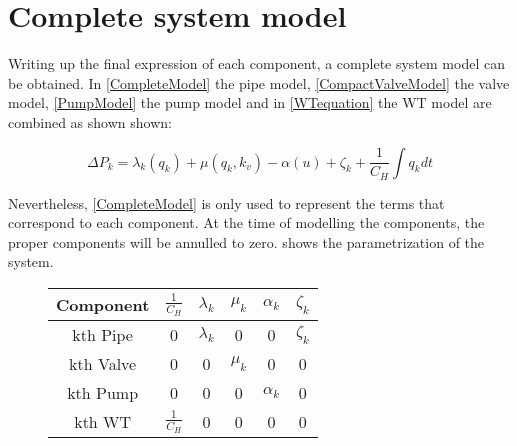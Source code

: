 \section{Complete system model} 
\label{CompleteSystemModel}

Writing up the final expression of each component, a complete system model can be obtained. In \eqref{CompleteModel} the pipe model, \eqref{CompactValveModel} the valve model,   \eqref{PumpModel} the pump model and in \eqref{WTequation} the WT model are combined as shown shown:

\begin{equation}
  \label{CompleteModel}
  \Delta P_k = \lambda_k (q_k) + \mu (q_k, k_v) - \alpha (u) + \zeta_k + \frac{1}{C_H}  \int   q_k dt 
\end{equation}

Nevertheless, \eqref{CompleteModel} is only used to represent the terms that correspond to each component. At the time of modelling the 
components, the proper components will be annulled to zero.  shows the 
parametrization of the system.

\begin{figure}[H]
	\centering
\begin{tabular}{c|ccccc} 
  			\bfseries Component    &   $\frac{1}{C_H}$    &     $\lambda_k$    &     $\mu_k$    &     $\alpha_k$    &     $\zeta_k$  					\\ 
  			\hline
			kth Pipe		  	      &      0                    &         $\lambda_k$                            &    0                             &            0                       &      $\zeta_k$   		                         \\ 
			kth Valve           	      &      0                    &         0                            &    $\mu_k$                             &            0                       &      0    					 \\ 
			kth Pump 		      &      0                    &         0                            &    0                             &            $\alpha_k$                       &      0    				         \\ 
			kth WT                           &      $\frac{1}{C_H}$                   &         0                            &    0                             &            0                       &      0     
\end{tabular}
		\label{tab:parametrization_model}

\end{figure}	


